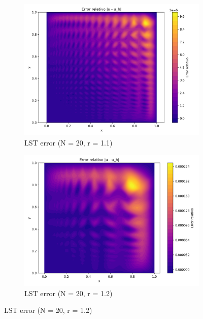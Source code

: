 \documentclass[12pt]{article}
\begin{document}
\begin{figure}[H]
    \centering
    \begin{subfigure}[t]{0.32\textwidth}
        \centering
        \includegraphics[width=\textwidth]{Graficos/21/LST_relative_error_colormap.png}
        \caption{LST error (N = 20, r = 1.1)}
        \label{fig:lst_error_r1.1_n20}
    \end{subfigure}
    \hfill
    \begin{subfigure}[t]{0.32\textwidth}
        \centering
        \includegraphics[width=\textwidth]{Graficos/22/LST_relative_error_colormap.png}
        \caption{LST error (N = 20, r = 1.2)}
        \label{fig:lst_error_r1.2_n20}
    \end{subfigure}

\end{figure}
\end{document}
